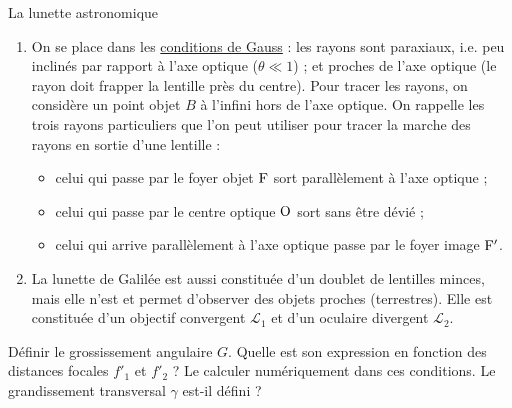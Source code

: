 \begin{exo}[1][TD]{La lunette astronomique}
\begin{questions}
{\begin{enumerate}
			Ce système ne possède pas de foyer image (l'image d'un objet à l'infini est elle-même à l'infini) ni objet (l'objet donnant une image à l'infini est lui-même à l'infini). On parle donc de . La distance entre les lentilles vaut donc 
			\item  On se place dans les \underline{conditions de Gauss} : les rayons sont paraxiaux, i.e. peu inclinés par rapport à l'axe optique ($\theta\ll1$) ; et proches de l'axe optique (le rayon doit frapper la lentille près du centre). Pour tracer les rayons, on considère un point objet $B$ à l'infini hors de l'axe optique. On rappelle les trois rayons particuliers que l'on peut utiliser pour tracer la marche des rayons en sortie d'une lentille :
			\begin{itemize}
				\item celui qui passe par le foyer objet $\rm F$ sort parallèlement à l'axe optique ;
				\item celui qui passe par le centre optique $\rm O$ sort sans être dévié ;
				\item celui qui arrive parallèlement à l'axe optique passe par le foyer image $\rm F'$.
			\end{itemize}
			\item	La lunette de Galilée est aussi constituée d'un doublet de lentilles minces, mais elle n'est  et permet d'observer des objets proches (terrestres). Elle est constituée d'un objectif convergent $\mathcal{L}_1$ et d'un oculaire divergent $\mathcal{L}_2$.
		\end{enumerate}
	}

	\item Définir le grossissement angulaire $G$. Quelle est son expression en fonction des distances focales $f'_{1}$ et $f'_{2}$ ? Le
  calculer numériquement dans ces conditions. Le grandissement transversal $\gamma$ est-il défini ?
	

\end{questions}
\end{exo}

